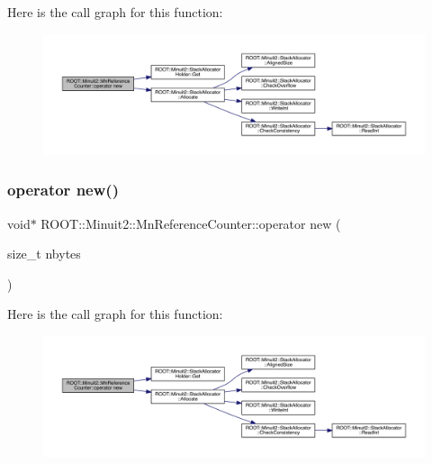 Here is the call graph for this function\+:
\nopagebreak
\begin{figure}[H]
\begin{center}
\leavevmode
\includegraphics[width=350pt]{dc/da2/classROOT_1_1Minuit2_1_1MnReferenceCounter_af7e9fdee3f67cac68328bbd05f6f2958_cgraph}
\end{center}
\end{figure}
\mbox{\label{classROOT_1_1Minuit2_1_1MnReferenceCounter_af7e9fdee3f67cac68328bbd05f6f2958}} 
\subsubsection{\texorpdfstring{operator new()}{operator new()}\hspace{0.1cm}{\footnotesize\ttfamily [2/3]}}
{\footnotesize\ttfamily void$\ast$ R\+O\+O\+T\+::\+Minuit2\+::\+Mn\+Reference\+Counter\+::operator new (\begin{DoxyParamCaption}\item[{size\+\_\+t}]{nbytes }\end{DoxyParamCaption})\hspace{0.3cm}{\ttfamily [inline]}}

Here is the call graph for this function\+:
\nopagebreak
\begin{figure}[H]
\begin{center}
\leavevmode
\includegraphics[width=350pt]{dc/da2/classROOT_1_1Minuit2_1_1MnReferenceCounter_af7e9fdee3f67cac68328bbd05f6f2958_cgraph}
\end{center}
\end{figure}
\mbox{\label{classROOT_1_1Minuit2_1_1MnReferenceCounter_af7e9fdee3f67cac68328bbd05f6f2958}} 
